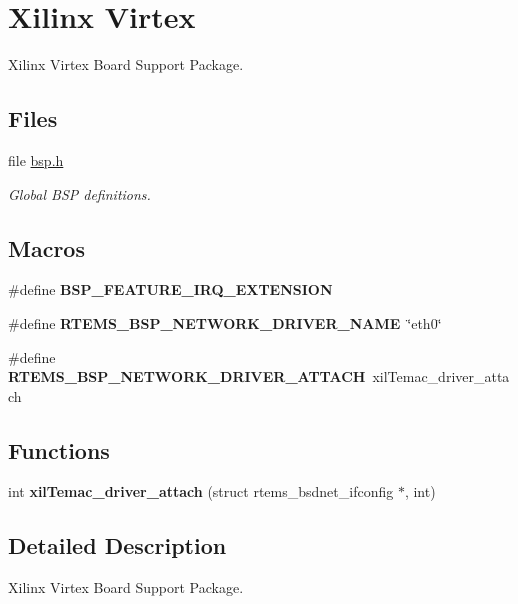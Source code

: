 \hypertarget{group__RTEMSBSPsPowerPCVirtex}{}\section{Xilinx Virtex}
\label{group__RTEMSBSPsPowerPCVirtex}


Xilinx Virtex Board Support Package.  


\subsection*{Files}
\begin{DoxyCompactItemize}
\item 
file \mbox{\hyperlink{bsps_2powerpc_2virtex_2include_2bsp_8h}{bsp.\+h}}
\begin{DoxyCompactList}\small\item\em Global B\+SP definitions. \end{DoxyCompactList}\end{DoxyCompactItemize}
\subsection*{Macros}
\begin{DoxyCompactItemize}
\item 
\mbox{\label{group__RTEMSBSPsPowerPCVirtex_ga5d7d631d3a14b7554160f14eb42f351b}} 
\#define {\bfseries B\+S\+P\+\_\+\+F\+E\+A\+T\+U\+R\+E\+\_\+\+I\+R\+Q\+\_\+\+E\+X\+T\+E\+N\+S\+I\+ON}
\item 
\mbox{\label{group__RTEMSBSPsPowerPCVirtex_ga86d4f9aa98431100692e31068070a8df}} 
\#define {\bfseries R\+T\+E\+M\+S\+\_\+\+B\+S\+P\+\_\+\+N\+E\+T\+W\+O\+R\+K\+\_\+\+D\+R\+I\+V\+E\+R\+\_\+\+N\+A\+ME}~\char`\"{}eth0\char`\"{}
\item 
\mbox{\label{group__RTEMSBSPsPowerPCVirtex_gadde0d66aef9442971dde465292ac14e6}} 
\#define {\bfseries R\+T\+E\+M\+S\+\_\+\+B\+S\+P\+\_\+\+N\+E\+T\+W\+O\+R\+K\+\_\+\+D\+R\+I\+V\+E\+R\+\_\+\+A\+T\+T\+A\+CH}~xil\+Temac\+\_\+driver\+\_\+attach
\end{DoxyCompactItemize}
\subsection*{Functions}
\begin{DoxyCompactItemize}
\item 
\mbox{\label{group__RTEMSBSPsPowerPCVirtex_ga8a51ad3a2169cecfa9d92a094446335d}} 
int {\bfseries xil\+Temac\+\_\+driver\+\_\+attach} (struct rtems\+\_\+bsdnet\+\_\+ifconfig $\ast$, int)
\end{DoxyCompactItemize}


\subsection{Detailed Description}
Xilinx Virtex Board Support Package. 

